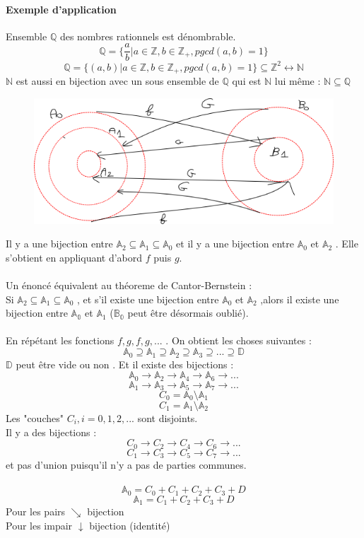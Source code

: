 \documentclass[base.tex]{subfiles}
\begin{document}
\paragraph{Exemple d'application}
Ensemble $\mathbb{Q}$ des nombres rationnels est dénombrable.
\[\mathbb{Q}=\{\frac{a}{b}| a \in \mathbb{Z} , b \in \mathbb{Z}_+ , pgcd(a,b)=1\}\]
\[\mathbb{Q}=\{(a,b)| a \in \mathbb{Z} , b \in \mathbb{Z}_+ , pgcd(a,b) = 1 \} \subseteq \mathbb{Z}^2 \leftrightarrow \mathbb{N}\]
$\mathbb{N}$ est aussi en bijection avec un sous ensemble de $\mathbb{Q}$ qui est $\mathbb{N}$ lui même : $\mathbb{N} \subseteq \mathbb{Q}$

      \begin{figure}[!h]
         \centering
         \includegraphics[scale=0.8]{path3556}
      \end{figure}

Il y a une bijection entre $\mathbb{A}_2 \subseteq \mathbb{A}_1 \subseteq \mathbb{A}_0$ et il y a une bijection entre $\mathbb{A}_0 $ et $\mathbb{A}_2$ . Elle s'obtient en appliquant d'abord $f$ puis $g$. \\
\\
Un énoncé équivalent au théoreme de Cantor-Bernstein :\\
Si $\mathbb{A}_2 \subseteq \mathbb{A}_1 \subseteq \mathbb{A}_0$ , et s'il existe une bijection entre $\mathbb{A}_0$ et $\mathbb{A}_2$ ,alors il existe une bijection entre $\mathbb{A_0}$ et $\mathbb{A}_1$ ($\mathbb{B_0}$ peut être désormais oublié).\\
\\
En répétant les fonctions $f,g,f,g,...$ . On obtient les choses suivantes :
\[\mathbb{A}_0 \supseteq \mathbb{A}_1 \supseteq \mathbb{A}_2 \supseteq \mathbb{A}_3 \supseteq ... \supseteq \mathbb{D} \]
$\mathbb{D}$ peut être vide ou non . Et il existe des bijections :
\[\mathbb{A}_0 \rightarrow\mathbb{A}_2 \rightarrow\mathbb{A}_4 \rightarrow \mathbb{A}_6\rightarrow ...\]
\[\mathbb{A}_1 \rightarrow\mathbb{A}_3 \rightarrow\mathbb{A}_5 \rightarrow \mathbb{A}_7\rightarrow ...\]
\[C_0=\mathbb{A}_0\setminus\mathbb{A}_1\]
\[C_1=\mathbb{A}_1\setminus\mathbb{A}_2\]
Les "couches" $C_i,i=0,1,2,...$ sont disjoints.\\
Il y a des bijections :
\[C_0 \rightarrow C_2 \rightarrow C_4 \rightarrow C_6 \rightarrow ...\]
\[C_1 \rightarrow C_3 \rightarrow C_5 \rightarrow C_7 \rightarrow ...\]
et pas d'union puisqu'il n'y a pas de parties communes.
\\
\\
\[\mathbb{A}_0 = C_0 + C_1 + C_2 + C_3 + D\]
\[\mathbb{A}_1 =       C_1 + C_2 + C_3 + D\]
Pour les pairs $\searrow$ bijection\\
Pour les impair $\downarrow$ bijection (identité)
\end{document}
